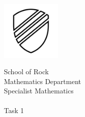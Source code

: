 \begin{coverpages}
{
\renewcommand\labelitemi{$\vcenter{\hbox{\tiny$\bullet$}}$}
    \begin{minipage}{0.25\linewidth}
        \includegraphics[width=2.9cm]{include/crest.png}
    \end{minipage}
    \begin{minipage}{0.7\linewidth}
        \begin{flushright}
        {\large
            School of Rock\\\vspace{1ex}
            Mathematics Department\\\vspace{1ex}
            Specialist Mathematics\\\vspace{1ex}
            \the\year{}\\\vspace{1ex}
            Task 1\\\vspace{1ex}
        }
            \end{flushright}
    \end{minipage}
    
}
\end{coverpages}
